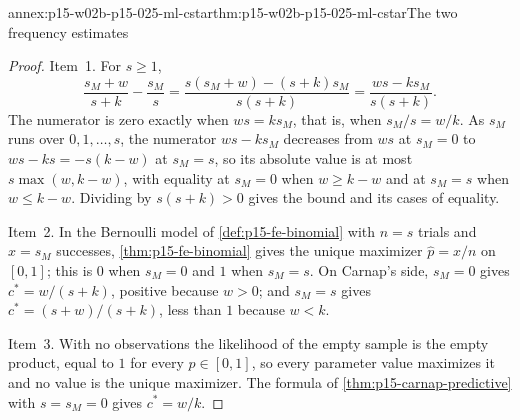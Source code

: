 \begin{annexitem}{annex:p15-w02b-p15-025-ml-cstar}{thm:p15-w02b-p15-025-ml-cstar}{The two frequency estimates}
\begin{proof}
Item~1. For \(s\ge1\),
\[
 \frac{s_M+w}{s+k}-\frac{s_M}{s}
 =\frac{s(s_M+w)-(s+k)s_M}{s(s+k)}
 =\frac{ws-ks_M}{s(s+k)} .
\]
The numerator is zero exactly when \(ws=ks_M\), that is, when
\(s_M/s=w/k\). As \(s_M\) runs over \(0,1,\ldots,s\), the numerator
\(ws-ks_M\) decreases from \(ws\) at \(s_M=0\) to \(ws-ks=-s(k-w)\) at
\(s_M=s\), so its absolute value is at most \(s\max(w,k-w)\), with
equality at \(s_M=0\) when \(w\ge k-w\) and at \(s_M=s\) when
\(w\le k-w\). Dividing by \(s(s+k)>0\) gives the bound and its cases of
equality.

Item~2. In the Bernoulli model of \cref{def:p15-fe-binomial} with
\(n=s\) trials and \(x=s_M\) successes, \cref{thm:p15-fe-binomial}
gives the unique maximizer \(\widehat p=x/n\) on \([0,1]\); this is
\(0\) when \(s_M=0\) and \(1\) when \(s_M=s\). On Carnap's side,
\(s_M=0\) gives \(c^*=w/(s+k)\), positive because \(w>0\); and
\(s_M=s\) gives \(c^*=(s+w)/(s+k)\), less than \(1\) because \(w<k\).

Item~3. With no observations the likelihood of the empty sample is the
empty product, equal to \(1\) for every \(p\in[0,1]\), so every
parameter value maximizes it and no value is the unique maximizer. The
formula of \cref{thm:p15-carnap-predictive} with \(s=s_M=0\) gives
\(c^*=w/k\).
\end{proof}
\end{annexitem}

